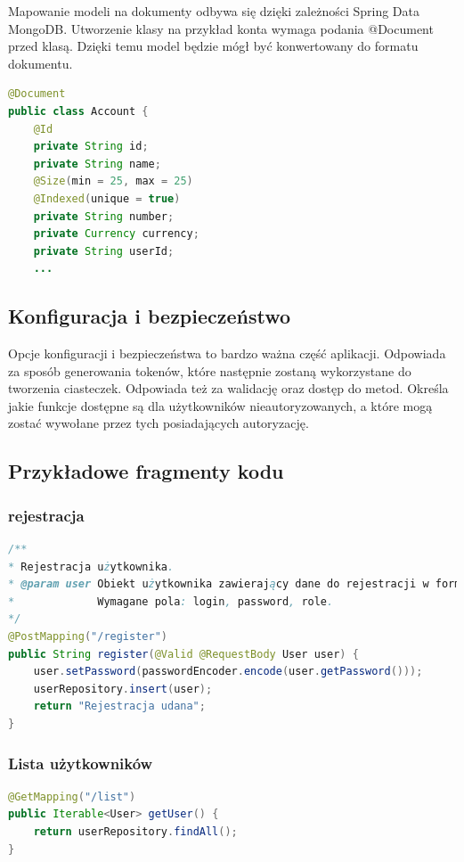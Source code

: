 Mapowanie modeli na dokumenty odbywa się dzięki zależności Spring Data MongoDB. Utworzenie klasy na przykład konta wymaga podania @Document przed klasą. Dzięki temu model będzie mógł być konwertowany do formatu dokumentu.
\begin{lstlisting}[language={Java}, caption={Fragment modelu Account}, label={lst:java-Account}]
@Document
public class Account {
	@Id
	private String id;
	private String name;
	@Size(min = 25, max = 25)
	@Indexed(unique = true)
	private String number;
	private Currency currency;
	private String userId;
	...
\end{lstlisting}
\subsection*{Konfiguracja i bezpieczeństwo}
Opcje konfiguracji i bezpieczeństwa to bardzo ważna część aplikacji. Odpowiada za sposób generowania tokenów, które następnie zostaną wykorzystane do tworzenia ciasteczek. Odpowiada też za walidację oraz dostęp do metod. Określa jakie funkcje dostępne są dla użytkowników nieautoryzowanych, a które mogą zostać wywołane przez tych posiadających autoryzację. 
\subsection*{Przykładowe fragmenty kodu}
\subsubsection*{rejestracja}
\begin{lstlisting}[language={Java}, caption={Rejestracja użytkownika}, label={lst:java-register}]
/**
* Rejestracja użytkownika.
* @param user Obiekt użytkownika zawierający dane do rejestracji w formacie JSON.
*             Wymagane pola: login, password, role.
*/
@PostMapping("/register")
public String register(@Valid @RequestBody User user) {
	user.setPassword(passwordEncoder.encode(user.getPassword()));
	userRepository.insert(user);
	return "Rejestracja udana";
}
\end{lstlisting}
\subsubsection*{Lista użytkowników}
\begin{lstlisting}[language={Java}, caption={Lista użytkowników}, label={lst:java-list}]
@GetMapping("/list")
public Iterable<User> getUser() {
	return userRepository.findAll();
}
\end{lstlisting}
